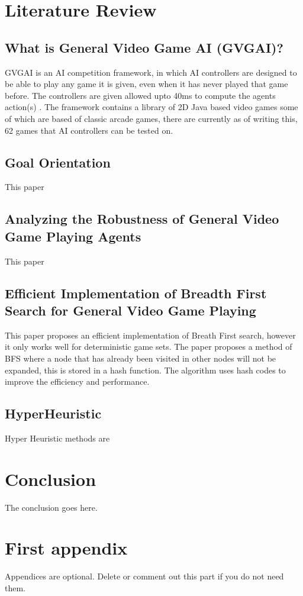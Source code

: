\documentclass[journal]{IEEEtran}
\begin{document}
\section{Literature Review}
\subsection{What is General Video Game AI (GVGAI)?}

GVGAI is an AI competition framework, in which AI controllers are designed to be able to play any game it is given, even when it has never played that game before. The controllers are given allowed upto 40ms to compute the agents action(s) \cite{perez2016GVGAICompetition, GVGAI}.
The framework contains a library of 2D Java based video games some of which are based of classic arcade games, there are currently as of writing this, 62 games that AI controllers can be tested on.

\subsection{Goal Orientation}
This paper 
\cite{ross2014general}


\subsection{Analyzing the Robustness of General Video Game Playing Agents}
This paper 
\cite{perez2016analyzing}

\subsection{Efficient Implementation of Breadth First Search for General Video Game Playing}
This paper proposes an efficient implementation of Breath First search, however it only works well for deterministic game sets.
The paper proposes a method of BFS where a node that has already been visited in other nodes will not be expanded, this is stored in a hash function.
The algorithm uses hash codes to improve the efficiency and performance.

\cite{EfficientBFS}

\subsection{HyperHeuristic}
Hyper Heuristic methods are 
\cite{hyperHeurisicMendes}

\section{Conclusion}
The conclusion goes here.






\appendices
\section{First appendix}
Appendices are optional. Delete or comment out this part if you do not need them.

\end{document}
